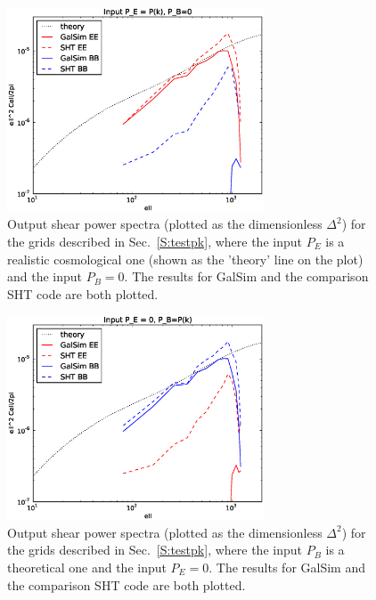 \documentclass[preprint]{aastex}
\begin{document}
\begin{figure}
\begin{center}
\includegraphics[width=3in]{../external/test_gridshear/output/compare_input_pe.eps}
\caption{Output shear power spectra (plotted as the dimensionless
  $\Delta^2$) for the grids described in Sec.~\ref{S:testpk}, where
  the input $P_E$ is a realistic cosmological one (shown as the 'theory' line on
  the plot) and the input $P_B=0$. The results for GalSim and the
  comparison SHT code are both plotted.\label{F:pe}}
\end{center}
\end{figure}

\begin{figure}
\begin{center}
\includegraphics[width=3in]{../external/test_gridshear/output/compare_input_pb.eps}
\caption{Output shear power spectra (plotted as the dimensionless
  $\Delta^2$) for the grids described in Sec.~\ref{S:testpk}, where
  the input $P_B$ is a theoretical one and the input $P_E=0$. The results for GalSim and the
  comparison SHT code are both plotted.\label{F:pb}}
\end{center}
\end{figure}
\end{document}
